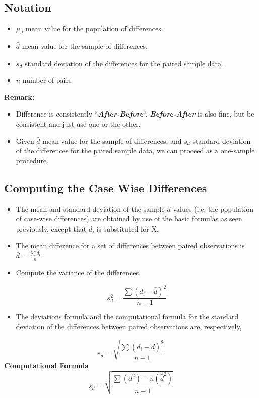 \documentclass[a4paper,12pt]{article}
\begin{document}
\subsection*{Notation}
\begin{itemize}
\item $\mu_d$ mean value for the population of differences.
\item $\bar{d}$ mean value for the sample of differences,
\item $s_d$ standard deviation of the differences for the paired sample data.
\item $n$ number of pairs
\end{itemize}
\noindent \textbf{Remark:} 
\begin{itemize}
    \item Difference is consistently ``\textbf{\textit{After-Before}}``.
\textbf{\textit{Before-After}} is also fine, but be consistent and just use one or the other.
\item Given $\bar{d}$ mean value for the sample of differences, and $s_d$ standard deviation of the differences for the paired sample data, we can proceed as a one-sample procedure.
\end{itemize}



\subsection*{Computing the Case Wise Differences}

\begin{itemize}
\item The mean and standard deviation of the sample $d$ values (i.e. the population of case-wise differences) are
obtained by use of the basic formulas as seen previously, except
that $d$, is substituted for X.

\item The mean difference for a set of differences between paired
observations is $\bar{d} = \frac{\sum d_{i}}{n}$.

\item Compute the variance of the differences.


\[s_d^2 = \frac{\sum (d_i-\bar{d})^2}{n-1}\]
\item The deviations formula and the computational formula for the
standard deviation of the differences between paired observations
are, respectively,
\end{itemize}
\[s_{d} = \sqrt{\frac{\sum (d_{i}-\bar{d})^2}{n-1}}\]
\noindent \textbf{Computational Formula}
\[s_{d} = \sqrt{\frac{ \sum (d^2)- n(\bar{d}^2)}{n-1}}\]
\end{document}
